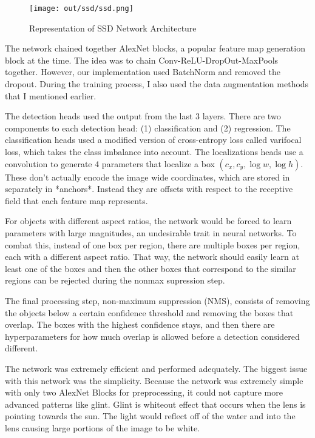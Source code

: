 \documentclass[12pt]{article}
\begin{document}
\begin{figure}[h]
    \centering
    \texttt{[image: out/ssd/ssd.png]}
    \caption{Representation of SSD Network Architecture}
    \label{fig:ssd_network}
\end{figure}

The network chained together AlexNet blocks, a popular feature map generation block at the time. \cite{krizhevskyImageNetClassificationDeep2012} The idea was to chain Conv-ReLU-DropOut-MaxPools together. However, our implementation used BatchNorm and removed the dropout. During the training process, I also used the data augmentation methods that I mentioned earlier. 

The detection heads used the output from the last 3 layers. There are two components to each detection head: (1) classification and (2) regression. The classification heads used a modified version of cross-entropy loss called varifocal loss, which takes the class imbalance into account. \cite{zhangVarifocalNetIoUawareDense2021} The localizations heads use a convolution to generate 4 parameters that localize a box $(c_x, c_y,\log{w},\log{h})$. These don't actually encode the image wide coordinates, which are stored in separately in *anchors*. Instead they are offsets with respect to the receptive field that each feature map represents. 

For objects with different aspect ratios, the network would be forced to learn parameters with large magnitudes, an undesirable trait in neural networks. To combat this, instead of one box per region, there are multiple boxes per region, each with a different aspect ratio. That way, the network should easily learn at least one of the boxes and then the other boxes that correspond to the similar regions can be rejected during the nonmax supression step. 

The final processing step, non-maximum suppression (NMS), consists of removing the objects below a certain confidence threshold and removing the boxes that overlap. The boxes with the highest confidence stays, and then there are hyperparameters for how much overlap is allowed before a detection considered different.

The network was extremely efficient and performed adequately. The biggest issue with this network was  the simplicity. Because the network was extremely simple with only two AlexNet Blocks for preprocessing, it could not capture more advanced patterns like glint. Glint is whiteout effect that occurs when the lens is pointing towards the sun. The light would reflect off of the water and into the lens causing large portions of the image to be white.
\end{document}
